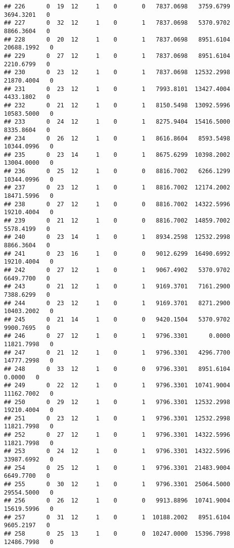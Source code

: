 \documentclass[
]{article}
\begin{document}
\begin{enumerate}
\begin{verbatim}
## 226      0  19  12     1    0       0   7837.0698   3759.6799   3694.3201   0
## 227      0  32  12     1    0       1   7837.0698   5370.9702   8866.3604   0
## 228      0  20  12     1    0       1   7837.0698   8951.6104  20688.1992   0
## 229      0  27  12     1    0       1   7837.0698   8951.6104   2210.6799   0
## 230      0  23  12     1    0       1   7837.0698  12532.2998  21870.4004   0
## 231      0  23  12     1    0       1   7993.8101  13427.4004   4433.1802   0
## 232      0  21  12     1    0       1   8150.5498  13092.5996  10583.5000   0
## 233      0  24  12     1    0       1   8275.9404  15416.5000   8335.8604   0
## 234      0  26  12     1    0       1   8616.8604   8593.5498  10344.0996   0
## 235      0  23  14     1    0       1   8675.6299  10398.2002  13004.0000   0
## 236      0  25  12     1    0       0   8816.7002   6266.1299  10344.0996   0
## 237      0  23  12     1    0       1   8816.7002  12174.2002  18471.5996   0
## 238      0  27  12     1    0       0   8816.7002  14322.5996  19210.4004   0
## 239      0  21  12     1    0       0   8816.7002  14859.7002   5578.4199   0
## 240      0  23  14     1    0       1   8934.2598  12532.2998   8866.3604   0
## 241      0  23  16     1    0       0   9012.6299  16490.6992  19210.4004   0
## 242      0  27  12     1    0       1   9067.4902   5370.9702   6649.7700   0
## 243      0  21  12     1    0       1   9169.3701   7161.2900   7388.6299   0
## 244      0  23  12     1    0       1   9169.3701   8271.2900  10403.2002   0
## 245      0  21  14     1    0       0   9420.1504   5370.9702   9900.7695   0
## 246      0  27  12     1    0       1   9796.3301      0.0000  11821.7998   0
## 247      0  21  12     1    0       1   9796.3301   4296.7700  14777.2998   0
## 248      0  33  12     1    0       0   9796.3301   8951.6104      0.0000   0
## 249      0  22  12     1    0       1   9796.3301  10741.9004  11162.7002   0
## 250      0  29  12     1    0       1   9796.3301  12532.2998  19210.4004   0
## 251      0  23  12     1    0       1   9796.3301  12532.2998  11821.7998   0
## 252      0  27  12     1    0       1   9796.3301  14322.5996  11821.7998   0
## 253      0  24  12     1    0       1   9796.3301  14322.5996  33987.6992   0
## 254      0  25  12     1    0       1   9796.3301  21483.9004   6649.7700   0
## 255      0  30  12     1    0       1   9796.3301  25064.5000  29554.5000   0
## 256      0  26  12     1    0       0   9913.8896  10741.9004  15619.5996   0
## 257      0  31  12     1    0       1  10188.2002   8951.6104   9605.2197   0
## 258      0  25  13     1    0       0  10247.0000  15396.7998  12486.7998   0

\end{verbatim}
\end{enumerate}
\end{document}
